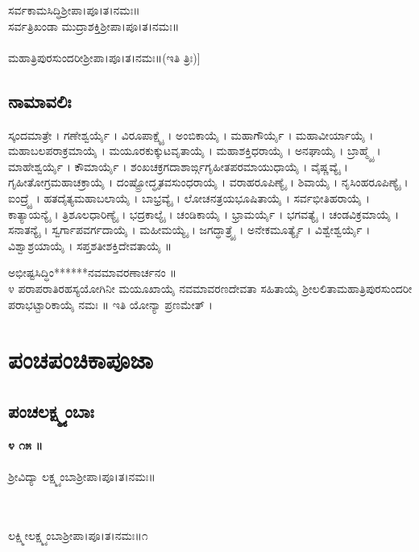  ಸರ್ವಕಾಮಸಿದ್ಧಿಶ್ರೀಪಾ।ಪೂ।ತ।ನಮಃ॥\\
 ಸರ್ವತ್ರಿಖಂಡಾ ಮುದ್ರಾಶಕ್ತಿಶ್ರೀಪಾ।ಪೂ।ತ।ನಮಃ॥\\
\\
 ಮಹಾತ್ರಿಪುರಸುಂದರೀಶ್ರೀಪಾ।ಪೂ।ತ।ನಮಃ॥(ಇತಿ ತ್ರಿಃ)]\,
\subsection{ನಾಮಾವಲಿಃ}
ಸ್ಕಂದಮಾತ್ರೇ । ಗಣೇಶ್ವರ್ಯೈ । ವಿರೂಪಾಕ್ಷ್ಯೈ । ಅಂಬಿಕಾಯೈ । ಮಹಾಗೌರ್ಯೈ । ಮಹಾವೀರ್ಯಾಯೈ । ಮಹಾಬಲಪರಾಕ್ರಮಾಯೈ । ಮಯೂರಕುಕ್ಕುಟವೃತಾಯೈ । ಮಹಾಶಕ್ತಿಧರಾಯೈ । ಅನಘಾಯೈ । ಬ್ರಾಹ್ಮ್ಯೈ । ಮಾಹೇಶ್ವರ್ಯೈ । ಕೌಮಾರ್ಯೈ । ಶಂಖಚಕ್ರಗದಾಶಾರ್ಙ್ಗಗೃಹೀತಪರಮಾಯುಧಾಯೈ । ವೈಷ್ಣವ್ಯೈ । ಗೃಹೀತೋಗ್ರಮಹಾಚಕ್ರಾಯೈ । ದಂಷ್ಟ್ರೋದ್ಧೃತವಸುಂಧರಾಯೈ । ವರಾಹರೂಪಿಣ್ಯೈ । ಶಿವಾಯೈ । ನೃಸಿಂಹರೂಪಿಣ್ಯೈ । ಐಂದ್ರ್ಯೈ । ಹತದೈತ್ಯಮಹಾಬಲಾಯೈ । ಬಾಭ್ರವ್ಯೈ । ಲೋಚನತ್ರಯಭೂಷಿತಾಯೈ । ಸರ್ವಭೀತಿಹರಾಯೈ । ಕಾತ್ಯಾಯನ್ಯೈ । ತ್ರಿಶೂಲಧಾರಿಣ್ಯೈ । ಭದ್ರಕಾಲ್ಯೈ । ಚಂಡಿಕಾಯೈ । ಭ್ರಾಮರ್ಯೈ । ಭಗವತ್ಯೈ । ಚಂಡವಿಕ್ರಮಾಯೈ । ಸನಾತನ್ಯೈ । ಸ್ವರ್ಗಾಪವರ್ಗದಾಯೈ । ಮಹೀಮಯ್ಯೈ । ಜಗದ್ಧಾತ್ರ್ಯೈ । ಅನೇಕಮೂರ್ತ್ಯೈ । ವಿಶ್ವೇಶ್ವರ್ಯೈ । ವಿಶ್ವಾಶ್ರಯಾಯೈ । ಸಪ್ತಶತೀಶಕ್ತಿದೇವತಾಯೈ ॥\\

  ಅಭೀಷ್ಟಸಿದ್ಧಿಂ******ನವಮಾವರಣಾರ್ಚನಂ ॥\\

೪ ಪರಾಪರಾತಿರಹಸ್ಯಯೋಗಿನೀ ಮಯೂಖಾಯೈ ನವಮಾವರಣದೇವತಾ ಸಹಿತಾಯೈ ಶ್ರೀಲಲಿತಾಮಹಾತ್ರಿಪುರಸುಂದರೀ ಪರಾಭಟ್ಟಾರಿಕಾಯೈ ನಮಃ ॥ ಇತಿ ಯೋನ್ಯಾ ಪ್ರಣಮೇತ್ ।
\section{ಪಂಚಪಂಚಿಕಾಪೂಜಾ}
\subsection{ಪಂಚಲಕ್ಷ್ಮ್ಯಂಬಾಃ}
{\bfseries ೪ ೧೫ ॥}\\
\\
ಶ್ರೀವಿದ್ಯಾ ಲಕ್ಷ್ಮ್ಯಂಬಾಶ್ರೀಪಾ।ಪೂ।ತ।ನಮಃ॥

\\
\\
ಲಕ್ಷ್ಮೀಲಕ್ಷ್ಮ್ಯಂಬಾಶ್ರೀಪಾ।ಪೂ।ತ।ನಮಃ॥೧

